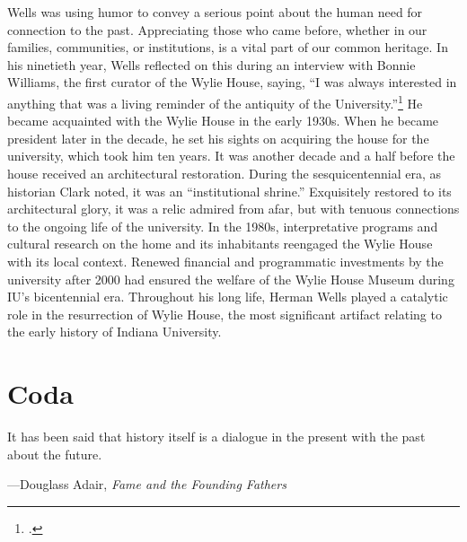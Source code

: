 \documentclass[
  american,
  letterpaper,
]{scrreprt}
\begin{document}
Wells was using humor to convey a serious point about the human need for
connection to the past. Appreciating those who came before, whether in
our families, communities, or institutions, is a vital part of our
common heritage. In his ninetieth year, Wells reflected on this during
an interview with Bonnie Williams, the first curator of the Wylie House,
saying, ``I was always interested in anything that was a living reminder
of the antiquity of the University.''\footnote{.} He became
acquainted with the Wylie House in the early 1930s. When he became
president later in the decade, he set his sights on acquiring the house
for the university, which took him ten years. It was another decade and
a half before the house received an architectural restoration. During
the sesquicentennial era, as historian Clark noted, it was an
``institutional shrine.'' Exquisitely restored to its architectural
glory, it was a relic admired from afar, but with tenuous connections to
the ongoing life of the university. In the 1980s, interpretative
programs and cultural research on the home and its inhabitants reengaged
the Wylie House with its local context. Renewed financial and
programmatic investments by the university after 2000 had ensured the
welfare of the Wylie House Museum during IU's bicentennial era.
Throughout his long life, Herman Wells played a catalytic role in the
resurrection of Wylie House, the most significant artifact relating to
the early history of Indiana University.


\chapter*{Coda}\label{coda}


\epigraph{It has been said that history itself is a dialogue in the present with the past about the future.}
{---Douglass Adair, \textit{Fame and the Founding Fathers}}
\end{document}
